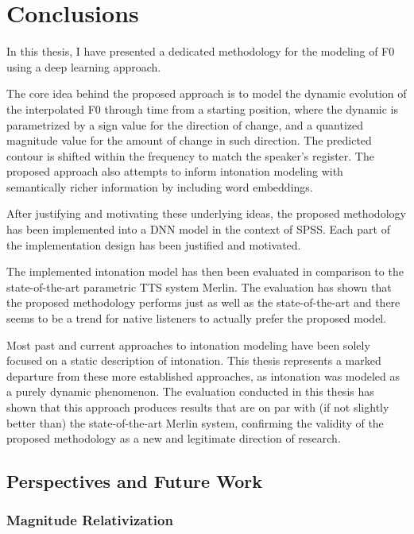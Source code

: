 
\chapter{Conclusions}\label{chap:conclusions}

In this thesis, I have presented a dedicated methodology for the modeling of \ac{F0} using a deep learning approach.

The core idea behind the proposed approach is to model the dynamic evolution of the interpolated \ac{F0} through time from a starting position, where the dynamic is parametrized by a sign value for the direction of change, and a quantized magnitude value for the amount of change in such direction.
The predicted contour is shifted within the frequency to match the speaker's register.
The proposed approach also attempts to inform intonation modeling with semantically richer information by including word embeddings.

After justifying and motivating these underlying ideas, the proposed methodology has been implemented into a \ac{DNN} model in the context of \ac{SPSS}.
Each part of the implementation design has been justified and motivated.

The implemented intonation model has then been evaluated in comparison to the state-of-the-art parametric  \ac{TTS} system Merlin.
The evaluation has shown that the proposed methodology performs just as well as the state-of-the-art and there seems to be a trend for native listeners to actually prefer the proposed model.

Most past and current approaches to intonation modeling have been solely focused on a static description of intonation.
This thesis represents a marked departure from these more established approaches, as intonation was modeled as a purely dynamic phenomenon.
The evaluation conducted in this thesis has shown that this approach produces results that are on par with (if not slightly better than) the state-of-the-art Merlin system, confirming the validity of the proposed methodology as a new and legitimate direction of research.


\section{Perspectives and Future Work}

\subsection{Magnitude Relativization}


